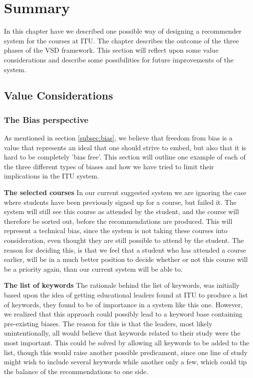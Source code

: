 
\section{Summary}
In this chapter have we described one possible way of designing a recommender system for the courses at ITU. The chapter describes the outcome of the three phases of the VSD framework.\newline
This section will reflect upon some value considerations and describe some possibilities for future improvements of the system. 

\subsection{Value Considerations} %
\label{sub:value_considerations}
\subsubsection{The Bias perspective}
\label{subsubsec:biasperspective}
As mentioned in section \ref{subsec:bias}, we believe that freedom from bias is a value that represents an ideal that one should strive to embed, but also that it is hard to be completely 'bias free'. This section will outline one example of each of the three different types of biases and how we have tried to limit their implications in the ITU system.\newline

\textbf{The selected courses}\newline
In our current suggested system we are ignoring the case where students have been previously signed up for a course, but failed it. The system will still see this course as attended by the student, and the course will therefore be sorted out, before the recommendations are produced.\newline
This will represent a technical bias, since the system is not taking these courses into consideration, even thought they are still possible to attend by the student. The reason for deciding this, is that we feel that a student who has attended a course earlier, will be in a much better position to decide whether or not this course will be a priority again, than our current system will be able to.\newline

\textbf{The list of keywords}\newline
The rationale behind the list of keywords, was initially based upon the idea of getting educational leaders found at ITU to produce a list of keywords, they found to be of importance in a system like this one. However, we realized that this approach could possibly lead to a keyword base containing pre-existing biases. The reason for this is that the leaders, most likely unintentionally, all would believe that keywords related to their study were the most important.\newline
This could be solved by allowing all keywords to be added to the list, though this would raise another possible predicament, since one line of study might wish to include several keywords while another only a few, which could tip the balance of the recommendations to one side.

